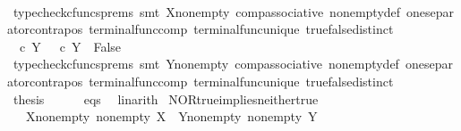 \begin{isabellebody}
\ \ \ \ \ \ \isamarkupfalse%
\ {\isacharparenleft}{\kern0pt}typecheck{\isacharunderscore}{\kern0pt}cfuncs{\isacharunderscore}{\kern0pt}prems{\isacharcomma}{\kern0pt}\ smt\ X{\isacharunderscore}{\kern0pt}nonempty\ comp{\isacharunderscore}{\kern0pt}associative{}\ nonempty{\isacharunderscore}{\kern0pt}def\ one{\isacharunderscore}{\kern0pt}separator{\isacharunderscore}{\kern0pt}contrapos\ terminal{\isacharunderscore}{\kern0pt}func{\isacharunderscore}{\kern0pt}comp\ terminal{\isacharunderscore}{\kern0pt}func{\isacharunderscore}{\kern0pt}unique\ true{\isacharunderscore}{\kern0pt}false{\isacharunderscore}{\kern0pt}distinct{\isacharparenright}{\kern0pt}\isanewline
\ \ \ \ \isamarkupfalse%
\ {\isachardoublequoteopen}{\isasymf}\ {\isasymcirc}\isactrlsub c\ {\isasymbeta}\isactrlbsub Y\isactrlesub \ {\isacharequal}{\kern0pt}\ {\isasymt}\ {\isasymcirc}\isactrlsub c\ {\isasymbeta}\isactrlbsub Y\isactrlesub \ {\isasymLongrightarrow}\ False{\isachardoublequoteclose}\isanewline
\ \ \ \ \ \ \isamarkupfalse%
\ {\isacharparenleft}{\kern0pt}typecheck{\isacharunderscore}{\kern0pt}cfuncs{\isacharunderscore}{\kern0pt}prems{\isacharcomma}{\kern0pt}\ smt\ Y{\isacharunderscore}{\kern0pt}nonempty\ comp{\isacharunderscore}{\kern0pt}associative{}\ nonempty{\isacharunderscore}{\kern0pt}def\ one{\isacharunderscore}{\kern0pt}separator{\isacharunderscore}{\kern0pt}contrapos\ terminal{\isacharunderscore}{\kern0pt}func{\isacharunderscore}{\kern0pt}comp\ terminal{\isacharunderscore}{\kern0pt}func{\isacharunderscore}{\kern0pt}unique\ true{\isacharunderscore}{\kern0pt}false{\isacharunderscore}{\kern0pt}distinct{\isacharparenright}{\kern0pt}\isanewline
\ \ \isamarkupfalse%
\isanewline
\ \ \isamarkupfalse%
\ \isamarkupfalse%
\ {\isacharquery}{\kern0pt}thesis\isanewline
\ \ \ \ \isamarkupfalse%
\ eqs\ \isamarkupfalse%
\ linarith\isanewline
{}\isamarkupfalse%
%
\endisatagproof
{\isafoldproof}%
%
\isadelimproof
\isanewline
%
\endisadelimproof
\isanewline
{}\isamarkupfalse%
\ NOR{\isacharunderscore}{\kern0pt}true{\isacharunderscore}{\kern0pt}implies{\isacharunderscore}{\kern0pt}neither{\isacharunderscore}{\kern0pt}true{\isacharcolon}{\kern0pt}\isanewline
\ \ \ X{\isacharunderscore}{\kern0pt}nonempty{\isacharcolon}{\kern0pt}\ {\isachardoublequoteopen}nonempty\ X{\isachardoublequoteclose}\ \ Y{\isacharunderscore}{\kern0pt}nonempty{\isacharcolon}{\kern0pt}\ {\isachardoublequoteopen}nonempty\ Y{\isachardoublequoteclose}\isanewline

\end{isabellebody}
